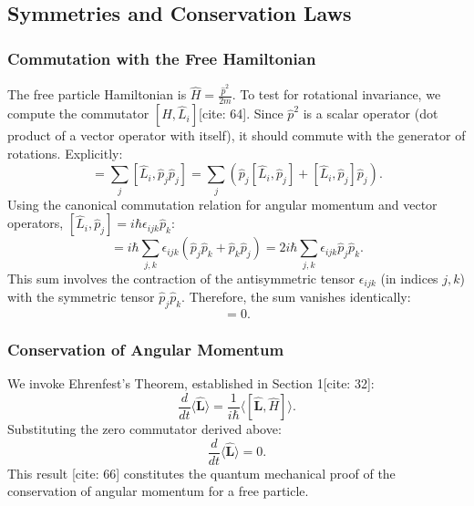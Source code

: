 \subsection{Symmetries and Conservation Laws}

\subsubsection{Commutation with the Free Hamiltonian}
The free particle Hamiltonian is $\hat{H} = \frac{\hat{p}^2}{2m}$. To test for rotational invariance, we compute the commutator $[\hat{H}, \hat{L}_i]$[cite: 64].
Since $\hat{p}^2$ is a scalar operator (dot product of a vector operator with itself), it should commute with the generator of rotations. Explicitly:
\begin{equation}
    [\hat{L}_i, \hat{p}^2] = \sum_j [\hat{L}_i, \hat{p}_j \hat{p}_j] = \sum_j \left( \hat{p}_j [\hat{L}_i, \hat{p}_j] + [\hat{L}_i, \hat{p}_j] \hat{p}_j \right).
\end{equation}
Using the canonical commutation relation for angular momentum and vector operators, $[\hat{L}_i, \hat{p}_j] = i\hbar \epsilon_{ijk} \hat{p}_k$:
\begin{equation}
    [\hat{L}_i, \hat{p}^2] = i\hbar \sum_{j,k} \epsilon_{ijk} (\hat{p}_j \hat{p}_k + \hat{p}_k \hat{p}_j) = 2i\hbar \sum_{j,k} \epsilon_{ijk} \hat{p}_j \hat{p}_k.
\end{equation}
This sum involves the contraction of the antisymmetric tensor $\epsilon_{ijk}$ (in indices $j,k$) with the symmetric tensor $\hat{p}_j \hat{p}_k$. Therefore, the sum vanishes identically:
\begin{equation}
    [\hat{H}, \hat{\mathbf{L}}] = 0.
\end{equation}

\subsubsection{Conservation of Angular Momentum}
We invoke Ehrenfest's Theorem, established in Section 1[cite: 32]:
\begin{equation}
    \frac{d}{dt}\langle \hat{\mathbf{L}} \rangle = \frac{1}{i\hbar} \langle [\hat{\mathbf{L}}, \hat{H}] \rangle.
\end{equation}
Substituting the zero commutator derived above:
\begin{equation}
    \frac{d}{dt}\langle \hat{\mathbf{L}} \rangle = 0.
\end{equation}
This result [cite: 66] constitutes the quantum mechanical proof of the conservation of angular momentum for a free particle.

